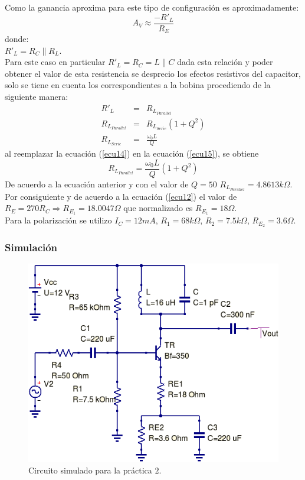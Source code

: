 \documentclass[11pt,graphicx,caption,rotating]{article}
\begin{document}
Como la ganancia aproxima para este tipo de configuración es aproximadamente:
\begin{equation}
 A_V \approx \frac{-R'_L}{R_E}
\label{ecu12}
\end{equation}
\noindent
donde:\\
$R'_L=R_C \parallel R_L$.\\
Para este caso en particular $R'_L = R_C=L\parallel C$ dada esta relación y poder obtener el valor de esta resistencia se desprecio los efectos resistivos del capacitor, solo se tiene en cuenta los correspondientes a la bobina procediendo de la siguiente manera:
\begin{eqnarray}
 R'_L & = & R_{L_{Parallel}} \label{ecu13}\\
 R_{L_{Parallel}} & = & R_{L_{Serie}}\left( {1 + Q^2 } \right) \label{ecu14}\\
 R_{L_{Serie}} & = & \frac{\omega _0 L}{Q}\label{ecu15}
\end{eqnarray}
\noindent
al reemplazar la ecuación (\ref{ecu14}) en la ecuación (\ref{ecu15}), se obtiene
\begin{equation}
 R_{L_{Parallel}}=\frac{\omega _0 L}{Q}\left( {1 + Q^2 } \right)
\label{ecu16}
\end{equation}
\noindent
De acuerdo a la ecuación anterior y con el valor de $Q=50$ $R_{L_{Parallel}}=4.8613 k\Omega$. Por consiguiente y de acuerdo a la ecuación (\ref{ecu12}) el valor de $R_E=270 R_C \Rightarrow R_{E_1}=18.0047 \Omega$ que normalizado es $R_{E_1}=18\Omega$.\\
Para la polarización se utilizo $I_C=12 mA$, $R_1=68 k\Omega$, $R_2=7.5 k\Omega$, $R_{E_2}=3.6 \Omega$.

\subsubsection{Simulación}

\begin{figure}[H]
	\centering
		\includegraphics[scale=0.6]{circuit_lab_2a.png}
	\caption{Circuito simulado para la práctica $2$.}
	\label{fig9}
\end{figure}
\end{document}
